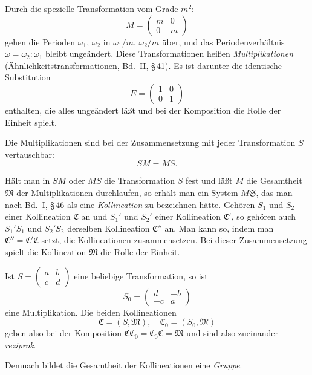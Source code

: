 \documentclass[12pt,a4paper]{article}
\begin{document}
Durch die spezielle Transformation vom Grade $m^2$:
\[
M = \begin{pmatrix} m & 0 \\ 0 & m \end{pmatrix}
\]
gehen die Perioden $\omega_1$, $\omega_2$ in $\omega_1/m$, $\omega_2/m$ \"uber, und das Periodenverh\"altnis $\omega=\omega_2:\omega_1$ bleibt unge\"andert. Diese Transformationen hei\ss en \emph{Multiplikationen} (\"Ahnlichkeitstransformationen, Bd.~II, \S\,41). Es ist darunter die identische Substitution
\[
E = \begin{pmatrix} 1 & 0 \\ 0 & 1 \end{pmatrix}
\]
enthalten, die alles unge\"andert l\"a\ss t und bei der Komposition die Rolle der Einheit spielt.

Die Multiplikationen sind bei der Zusammensetzung mit jeder Transformation $S$ vertauschbar:
\begin{equation}\label{eq:28_7}
SM = MS.
\end{equation}

\newpage
\noindent
H\"alt man in $SM$ oder $MS$ die Transformation $S$ fest und l\"a\ss t $M$ die Gesamtheit $\mathfrak{M}$ der Multiplikationen durchlaufen, so erh\"alt man ein System $M\mathfrak{S}$, das man nach Bd.~I, \S\,46 als eine \emph{Kollineation} zu bezeichnen h\"atte. Geh\"oren $S_1$ und $S_2$ einer Kollineation $\mathfrak{C}$ an und $S_1'$ und $S_2'$ einer Kollineation $\mathfrak{C}'$, so geh\"oren auch $S_1'S_1$ und $S_2'S_2$ derselben Kollineation $\mathfrak{C}''$ an. Man kann so, indem man $\mathfrak{C}''=\mathfrak{C}'\mathfrak{C}$ setzt, die Kollineationen zusammensetzen. Bei dieser Zusammensetzung spielt die Kollineation $\mathfrak{M}$ die Rolle der Einheit.

Ist $S=\begin{pmatrix}a&b\\c&d\end{pmatrix}$ eine beliebige Transformation, so ist
\[
S_0 = \begin{pmatrix} d & -b \\ -c & a \end{pmatrix}
\]
eine Multiplikation. Die beiden Kollineationen
\[
\mathfrak{C} = (S,\mathfrak{M}),\quad \mathfrak{C}_0 = (S_0,\mathfrak{M})
\]
geben also bei der Komposition $\mathfrak{C}\mathfrak{C}_0 = \mathfrak{C}_0\mathfrak{C} = \mathfrak{M}$ und sind also zueinander \emph{reziprok}.

Demnach bildet die Gesamtheit der Kollineationen eine \emph{Gruppe}.
\end{document}
